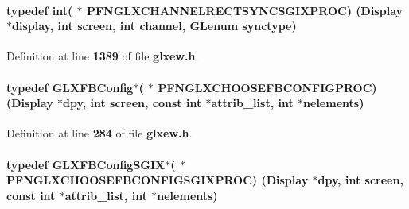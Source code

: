 \paragraph[{P\+F\+N\+G\+L\+X\+C\+H\+A\+N\+N\+E\+L\+R\+E\+C\+T\+S\+Y\+N\+C\+S\+G\+I\+X\+P\+R\+OC}]{\setlength{\rightskip}{0pt plus 5cm}typedef {\bf int}( $\ast$  P\+F\+N\+G\+L\+X\+C\+H\+A\+N\+N\+E\+L\+R\+E\+C\+T\+S\+Y\+N\+C\+S\+G\+I\+X\+P\+R\+OC) (Display $\ast${\bf display}, {\bf int} screen, {\bf int} channel, {\bf G\+Lenum} synctype)}\label{glxew_8h_a2a107d777f0ed432438bccd38640bedc}


Definition at line {\bf 1389} of file {\bf glxew.\+h}.

\paragraph[{P\+F\+N\+G\+L\+X\+C\+H\+O\+O\+S\+E\+F\+B\+C\+O\+N\+F\+I\+G\+P\+R\+OC}]{\setlength{\rightskip}{0pt plus 5cm}typedef {\bf G\+L\+X\+F\+B\+Config}$\ast$( $\ast$  P\+F\+N\+G\+L\+X\+C\+H\+O\+O\+S\+E\+F\+B\+C\+O\+N\+F\+I\+G\+P\+R\+OC) (Display $\ast$dpy, {\bf int} screen, const {\bf int} $\ast$attrib\+\_\+list, {\bf int} $\ast$nelements)}\label{glxew_8h_aaedde12273ed2b5c87f488384a437cad}


Definition at line {\bf 284} of file {\bf glxew.\+h}.

\paragraph[{P\+F\+N\+G\+L\+X\+C\+H\+O\+O\+S\+E\+F\+B\+C\+O\+N\+F\+I\+G\+S\+G\+I\+X\+P\+R\+OC}]{\setlength{\rightskip}{0pt plus 5cm}typedef {\bf G\+L\+X\+F\+B\+Config\+S\+G\+IX}$\ast$( $\ast$  P\+F\+N\+G\+L\+X\+C\+H\+O\+O\+S\+E\+F\+B\+C\+O\+N\+F\+I\+G\+S\+G\+I\+X\+P\+R\+OC) (Display $\ast$dpy, {\bf int} screen, const {\bf int} $\ast$attrib\+\_\+list, {\bf int} $\ast$nelements)}\label{glxew_8h_a6fdae56acf3d2f4d613924f2213b7cce}


